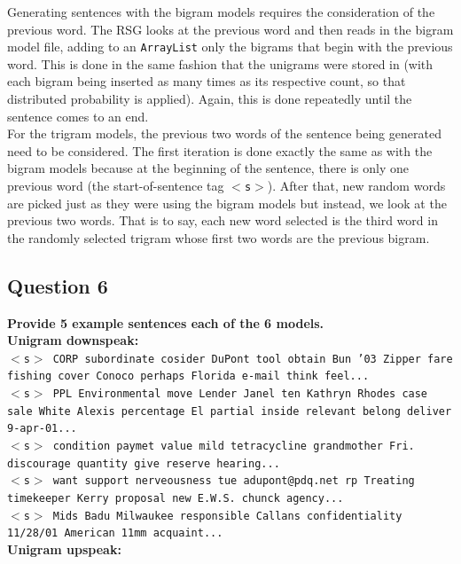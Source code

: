\documentclass{article} %
\begin{document}
Generating sentences with the bigram models requires the consideration of the previous word. The RSG looks at the previous word and then reads in the bigram model file, adding to an  \texttt{ArrayList} only the bigrams that begin with the previous word. This is done in the same fashion that the unigrams were stored in (with each bigram being inserted as many times as its respective count, so that distributed probability is applied). Again, this is done repeatedly until the sentence comes to an end.\\

For the trigram models, the previous two words of the sentence being generated need to be considered. The first iteration is done exactly the same as with the bigram models because at the beginning of the sentence, there is only one previous word (the start-of-sentence tag  \texttt{$<$s$>$}). After that, new random words are picked just as they were using the bigram models but instead, we look at the previous two words. That is to say, each new word selected is the third word in the randomly selected trigram whose first two words are the previous bigram.\\

\subsection*{Question 6}

\textbf{Provide 5 example sentences each of the 6 models.}
\\
\textbf{Unigram downspeak:}\\

\texttt{$<$s$>$ CORP subordinate cosider DuPont tool obtain Bun '03 Zipper fare fishing cover Conoco perhaps Florida e-mail think feel...\\
$<$s$>$ PPL Environmental move Lender Janel ten Kathryn Rhodes case sale White Alexis percentage El partial inside relevant belong deliver 9-apr-01...\\
$<$s$>$ condition paymet value mild tetracycline grandmother Fri. discourage quantity give reserve hearing...\\
$<$s$>$ want support nerveousness tue adupont@pdq.net rp Treating timekeeper Kerry proposal new E.W.S. chunck agency...\\
$<$s$>$ Mids Badu Milwaukee responsible Callans confidentiality 11/28/01 American 11mm acquaint...}\\

\textbf{Unigram upspeak:}\\
\end{document}
